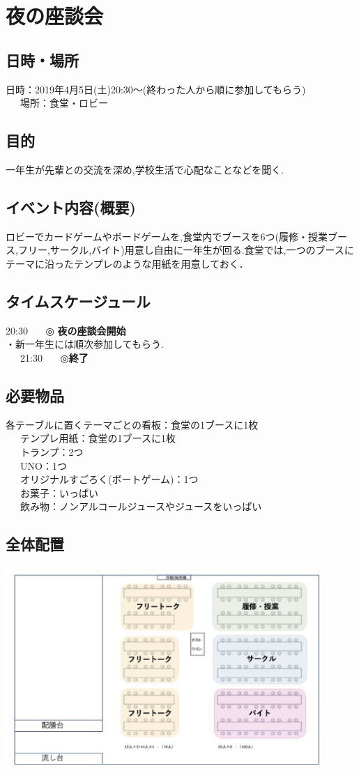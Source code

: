 \documentclass[a4j]{jarticle}
\begin{document}
\section{夜の座談会}
\subsection{日時・場所}
日時：2019年4月5日(土)20:30〜(終わった人から順に参加してもらう)\\
\ \ \ 場所：食堂・ロビー\\
\subsection{目的}
一年生が先輩との交流を深め,学校生活で心配なことなどを聞く.
\subsection{イベント内容(概要)}
ロビーでカードゲームやボードゲームを,食堂内でブースを6つ(履修・授業ブース,フリー,サークル,バイト)用意し自由に一年生が回る.食堂では,一つのブースに
テーマに沿ったテンプレのような用紙を用意しておく．
\subsection{タイムスケージュール}
20:30 \ \ \ ◎ \textbf{夜の座談会開始}\\
\hspace{15mm}・新一年生には順次参加してもらう.\\
\ \ \ 21:30 \ \ \ ◎\textbf{終了}
\subsection{必要物品}
各テーブルに置くテーマごとの看板：食堂の1ブースに1枚\\
\ \ \ テンプレ用紙：食堂の1ブースに1枚\\
\ \ \ トランプ：2つ\\
\ \ \ UNO：1つ\\
\ \ \ オリジナルすごろく(ボートゲーム)：1つ\\
\ \ \ お菓子：いっぱい\\
\ \ \ 飲み物：ノンアルコールジュースやジュースをいっぱい
\subsection{全体配置}
\begin{center}
\includegraphics[width=12cm]{./13/hone.eps}
\end{center}
\end{document}

